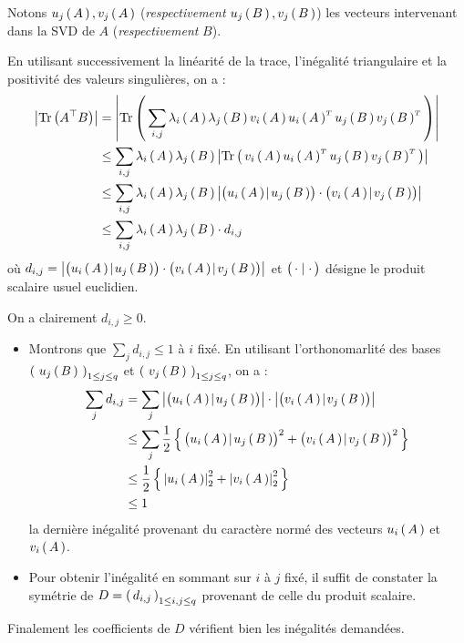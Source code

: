 \begin{rep}

 Notons $u_j\left( \, A \, \right), v_j\left( \, A \, \right)$ (\textit{respectivement} $u_j\left( \, B \, \right), v_j\left( \, B \, \right)$)
 les vecteurs intervenant dans la SVD de $A$ (\textit{respectivement} $B$).


 En utilisant successivement la linéarité de la trace, l'inégalité triangulaire
 et la positivité des valeurs singulières, on a :
 \begin{align*}
  \left| \operatorname { Tr } \left( A ^ { \top } B \right) \right|
   & =
  \abs{\tr{\prt{\sum_{i,j} \lambda_i\prt{A} \lambda_j\prt{B}v_i\prt{A}
     \transpose{u_i\prt{A}}u_j\prt{B}\transpose{v_j\prt{B}}}}}                            \\
   & \leq \sum_{i,j}\lambda_i\prt{A} \lambda_j\prt{B}\abs{\tr{\prt{ v_i\prt{A}
     \transpose{u_i\prt{A}}u_j\prt{B}\transpose{v_j\prt{B}}}}}                            \\
   & \leq \sum_{i,j}\lambda_i\prt{A} \lambda_j\prt{B} \abs{\bigps{u_i\prt{A}}{u_j\prt{B}}
   \cdot \bigps{v_i\prt{A}}{v_j\prt{B}}}                                                  \\
   & \leq \sum_{i,j}\lambda_i\prt{A} \lambda_j\prt{B} \cdot  d_{i,j}
 \end{align*}
 où $ \displaystyle d_{i,j} = \abs{\bigps{u_i\prt{A}}{u_j\prt{B}}
   \cdot \bigps{v_i\prt{A}}{v_j\prt{B}}} $ et $\bigl( \,\cdot\, \!\mid\! \,\cdot\, \bigr)$ désigne le
   produit scalaire usuel euclidien.

\newpage
 On a clairement $d_{i,j} \geq 0$.

 \begin{itemize}[font= \color{blue} \Large, label= $\bullet$]
  \item Montrons que $ \displaystyle \sum_j d_{i,j} \leq 1$ à $i$ fixé. En utilisant
        l'orthonomarlité des bases $\left( \, \,u_j\left( \, B \, \right)\, \, \right)_{1 \leq j \leq q}$ et
        $\left( \, \,v_j\left( \, B \, \right)\, \, \right)_{1 \leq j \leq q}$, on a :
        \begin{align*}
         \sum_j d_{i,j} & = \sum_j \abs{\bigps{u_i\prt{A}}{u_j\prt{B}}}
         \cdot \abs{\bigps{v_i\prt{A}}{v_j\prt{B}}}                                                                         \\
                        & \leq \sum_j \frac{1}{2} \acc{\bigps{u_i\prt{A}}{u_j\prt{B}}^2 + \bigps{v_i\prt{A}}{v_j\prt{B}}^2} \\
                        & \leq \frac{1}{2} \acc{\norm{u_i\prt{A}}_2^2+\norm{v_i\prt{A}}_2^2 }                               \\
                        & \leq 1
        \end{align*}
        la dernière inégalité provenant du caractère normé des vecteurs
        $u_i\left( \, A \, \right)$ et $v_i\left( \, A \, \right)$.
  \item Pour obtenir l'inégalité en sommant sur $i$ à $j$ fixé, il suffit de
        constater la symétrie de $D = \left( \, d_{i,j} \, \right)_{1 \leq i,j \leq q}$ provenant de
        celle du produit scalaire.
 \end{itemize}
 Finalement les coefficients de $D$ vérifient bien les inégalités demandées.
\end{rep}

